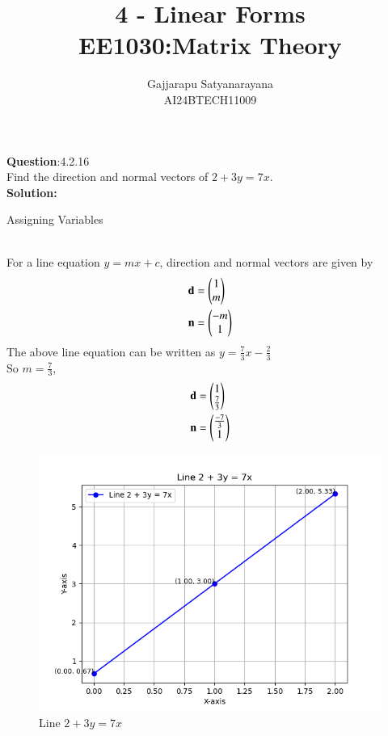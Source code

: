 \documentclass[journal]{IEEEtran}
\begin{document}

\vspace{3cm}

\title{
4 - Linear Forms \\
\large EE1030:Matrix Theory
}
\author{Gajjarapu Satyanarayana\\AI24BTECH11009
}
{\let\newpage\relax\maketitle}

\renewcommand{\thefigure}{\theenumi}
\renewcommand{\thetable}{\theenumi}



\renewcommand{\thetable}{\theenumi}


\textbf{Question}:4.2.16\\
Find the direction and normal vectors of $2 + 3y = 7x$.
\\
\textbf{Solution:}
\renewcommand{\tablename}{Table 4.2.16.1}
\begin{table}[h!]
  \centering
  
  \caption{Assigning Variables}
\end{table}
\\
For a line equation $y = mx + c$, direction and normal vectors are given by 
\begin{align}
\mathbf{d} & = \begin{pmatrix}1 \\ m\end{pmatrix} \\
\mathbf{n} & = \begin{pmatrix}-m \\ 1\end{pmatrix}
\end{align}
The above line equation can be written as $y = \frac{7}{3}x - \frac{2}{3}$ \\
So $m=\frac{7}{3}$,
\begin{align}
    \mathbf{d} & = \begin{pmatrix}1 \\ \frac{7}{3}\end{pmatrix} \\
    \mathbf{n} & = \begin{pmatrix}\frac{-7}{3} \\ 1\end{pmatrix}
\end{align}
\begin{figure}[h!]
   \centering
   \includegraphics[width=0.7\linewidth]{figs/line.png}
	\caption{Line $2 + 3y = 7x$}
   \end{figure}
\end{document}

